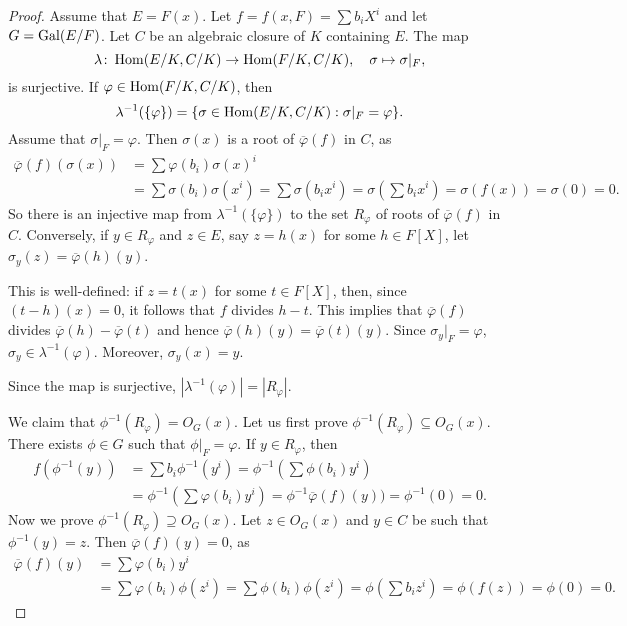  \begin{proof}
    Assume that $E=F(x)$. Let $f=f(x,F)=\sum b_iX^i$ and
    let $G=\operatorname{Gal}(E/F)$. Let $C$ be an algebraic closure of $K$ containing $E$. 
    The map
    \[
    \lambda\colon \operatorname{Hom}(E/K,C/K)\to\operatorname{Hom}(F/K,C/K),\quad
    \sigma\mapsto\sigma|_F,
    \]
    is surjective. If $\varphi\in\operatorname{Hom}(F/K,C/K)$, then
    \[
    \lambda^{-1}(\{\varphi\})=\{\sigma\in\operatorname{Hom}(E/K,C/K):\sigma|_F=\varphi\}.
    \]
    Assume that $\sigma|_F=\varphi$. Then 
    $\sigma(x)$ is a root of $\overline{\varphi}(f)$ in $C$, as 
    \begin{align*}
    \overline{\varphi}(f)(\sigma(x))&=\sum \varphi(b_i)\sigma(x)^i\\
    &=\sum\sigma(b_i)\sigma(x^i)
    =\sum\sigma(b_ix^i)=\sigma\left(\sum b_ix^i\right)=\sigma(f(x))=\sigma(0)=0.
    \end{align*}
    So there is an injective map from $\lambda^{-1}(\{\varphi\})$ 
    to the set $R_{\varphi}$ of roots of $\overline{\varphi}(f)$ in $C$. Conversely,
    if $y\in R_{\varphi}$ and $z\in E$, say $z=h(x)$ for some $h\in F[X]$, 
    let $\sigma_y(z)=\overline{\varphi}(h)(y)$. 
    
    This is well-defined: if $z=t(x)$ 
    for some $t\in F[X]$, then, since $(t-h)(x)=0$, it follows that 
    $f$ divides $h-t$. This implies that $\overline{\varphi}(f)$ divides
    $\overline{\varphi}(h)-\overline{\varphi}(t)$ and hence 
    $\overline{\varphi}(h)(y)=\overline{\varphi}(t)(y)$. 
    Since $\sigma_y|_F=\varphi$, $\sigma_y\in\lambda^{-1}(\varphi)$. 
    Moreover, $\sigma_y(x)=y$. 
    
    Since the map is surjective, $|\lambda^{-1}(\varphi)|=|R_{\varphi}|$. 
    
    We claim that $\phi^{-1}(R_{\varphi})=O_G(x)$. Let us first prove $\phi^{-1}(R_{\varphi})\subseteq O_G(x)$.  
    There exists $\phi\in G$ such that $\phi|_F=\varphi$. If $y\in R_{\varphi}$, 
    then 
    \begin{align*}
    f(\phi^{-1}(y))&=\sum b_i\phi^{-1}(y^i)=\phi^{-1}\left(\sum\phi(b_i)y^i\right)\\
    &=\phi^{-1}\left(\sum\varphi(b_i)y^i\right)=\phi^{-1}\overline{\varphi}(f)(y))=\phi^{-1}(0)=0.
    \end{align*}
    Now we prove $\phi^{-1}(R_{\varphi})\supseteq O_G(x)$. Let $z\in O_G(x)$ and $y\in C$ be such that 
    $\phi^{-1}(y)=z$. Then $\overline{\varphi}(f)(y)=0$, as
    \begin{align*}
    \overline{\varphi}(f)(y)&=\sum\varphi(b_i)y^i\\
    &=\sum\varphi(b_i)\phi(z^i)
    =\sum\phi(b_i)\phi(z^i)=\phi\left(\sum b_iz^i\right)=\phi(f(z))=\phi(0)=0.
    \end{align*}
    

\end{proof}
